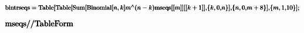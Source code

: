 \documentclass{article}
\begin{document}
\begin{doublespace}
\noindent\(\pmb{\text{bintrseqs} = }\\
\pmb{\text{Table}[}\\
\pmb{\text{Table}[}\\
\pmb{\text{Sum}[}\\
\pmb{\text{Binomial}}\\
\pmb{[}\\
\pmb{n,k]}\\
\pmb{m{}^{\wedge}}\\
\pmb{(n-k) }\\
\pmb{\text{mseqs}[[}\\
\pmb{m]][[}\\
\pmb{k+1]],}\\
\pmb{\{k,0,}\\
\pmb{n\}],}\\
\pmb{\{n,0,}\\
\pmb{m+8\}],}\\
\pmb{\{m,1,}\\
\pmb{10\}];}\)
\end{doublespace}

\begin{doublespace}
\noindent\(\pmb{\text{mseqs} \text{//} }\\
\pmb{\text{TableForm}}\)
\end{doublespace}
\end{document}

